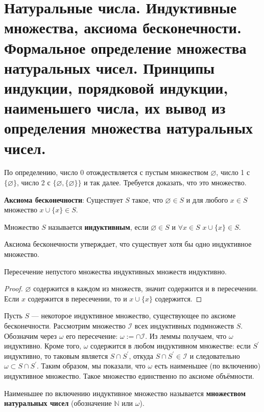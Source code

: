 \section{Натуральные числа. Индуктивные множества, аксиома бесконечности. Формальное определение множества
натуральных чисел. Принципы индукции, порядковой индукции, наименьшего числа, их вывод из определения множества
натуральных чисел.}

По определению, число 0 отождествляется с пустым множеством $\varnothing$, число 1 с $\{ \varnothing \}$, число 2 с
$\{ \varnothing, \{ \varnothing \}\}$ и так далее. Требуется доказать, что это множество.

\textbf{Аксиома бесконечности}: Существует $S$ такое, что $\varnothing \in S$ и для любого $x \in S$ множество $x
\cup\{x\} \in S$.

\begin{definition}
	Множество $S$ называется \textbf{индуктивным}, если $\varnothing \in S$ и $\forall x \in S$ $x \cup\{x\}
	\in S$.
\end{definition}

Аксиома бесконечности утверждает, что существует хотя бы одно индуктивное множество.

\begin{lemma}
	Пересечение непустого множества индуктивных множеств индуктивно.
\end{lemma}

\begin{proof}{$\varnothing$ содержится в каждом из множеств, значит содержится и в пересечении. Если $x$ содержится
	в пересечении, то и $x \cup\{x\}$ содержится.}
\end{proof}

Пусть $S$ — некоторое индуктивное множество, существующее по аксиоме бесконечности. Рассмотрим множество
$\mathcal{I}$ всех индуктивных подмножеств $S$.
Обозначим через $\omega$ его пересечение: $\omega:=\cap \mathcal{I}$. Из леммы  получаем, что $\omega$ индуктивно.
Кроме того, $\omega$ содержится в любом индуктивном множестве: если $S^{\prime}$ индуктивно, то таковым является $S
\cap S^{\prime}$, откуда $S \cap S^{\prime} \in \mathcal{I}$ и следовательно $\omega \subset S \cap S^{\prime}$.
Таким образом, мы показали, что $\omega$ есть наименьшее (по включению) индуктивное множество. Такое множество
единственно по аксиоме объёмности.

\begin{definition}
	Наименьшее по включению индуктивное множество называется \textbf{множеством натуральных чисел}
	(обозначение $\mathbb{N}$ или $\omega$).
\end{definition}

